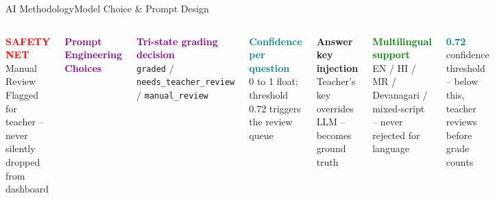 \documentclass[aspectratio=169,10pt]{beamer}
\newcommand{\sectionbox}[3]{%
  \vspace{4pt}
  \noindent\colorbox{card}{\parbox{0.92\linewidth}{%
    \vspace{4pt}
    \textcolor{#1}{\small\textbf{#2}}\\[2pt]
    \textcolor{txtsec}{\scriptsize #3}
    \vspace{4pt}
  }}
}
\begin{document}
\begin{frame}[t,shrink=5]{AI Methodology}{Model Choice \& Prompt Design}
\begin{columns}[T]
\colorbox{card}{\parbox{0.92\linewidth}{%
  \vspace{3pt}
  \textcolor{red}{\scriptsize\textbf{SAFETY NET}}\; \textcolor{txt}{\scriptsize Manual Review}\\
  \textcolor{txtsec}{\tiny Flagged for teacher -- never silently dropped from dashboard}
\vspace{3pt}}}

\vspace{4pt}
\textcolor{purple}{\small\textbf{Prompt Engineering Choices}}\\[5pt]
\sectionbox{purple}{Tri-state grading decision}{\texttt{graded} / \texttt{needs\_teacher\_review} / \texttt{manual\_review}}
\sectionbox{teal}{Confidence per question}{0 to 1 float; threshold 0.72 triggers the review queue}
\sectionbox{orng}{Answer key injection}{Teacher's key overrides LLM -- becomes ground truth}
\sectionbox{green}{Multilingual support}{EN / HI / MR / Devanagari / mixed-script -- never rejected for language}

\vspace{2pt}
\colorbox{card}{\parbox{0.92\linewidth}{\centering\vspace{3pt}
  \textcolor{teal}{\textbf{0.72}}\; \textcolor{txtsec}{\scriptsize confidence threshold -- below this, teacher reviews before grade counts}
\vspace{3pt}}}

\end{columns}
\end{frame}
\end{document}
